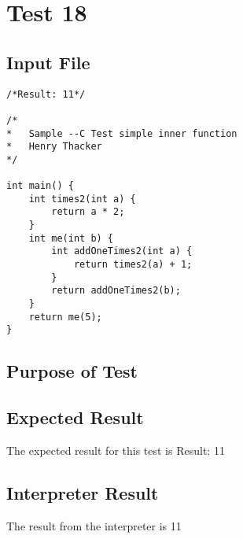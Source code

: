 \section{Test 18}
\subsection{Input File}
\begin{verbatim}
/*Result: 11*/

/*
*	Sample --C Test simple inner function
*	Henry Thacker
*/

int main() {
	int times2(int a) {
		return a * 2;
	}
	int me(int b) {
		int addOneTimes2(int a) { 
			return times2(a) + 1; 
		}
		return addOneTimes2(b);
	}
	return me(5);
}\end{verbatim}\subsection{Purpose of Test}

\subsection{Expected Result}
The expected result for this test is Result: 11
\subsection{Interpreter Result}
The result from the interpreter is 11
